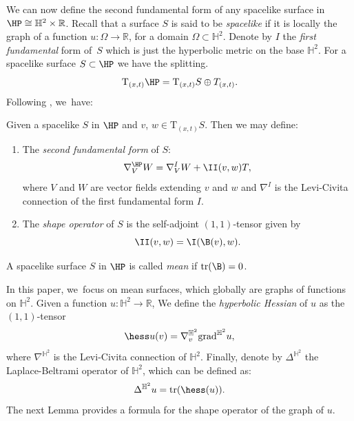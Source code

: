 We can now define the second fundamental form of any spacelike surface in $\HP\cong\mathbb{H}^2\times\mathbb{R}$. Recall that a surface $S$ is said to be \emph{spacelike} if it is locally the graph of a function $u : \Omega \to\mathbb{R}$, for a domain $\Omega\subset \mathbb{H}^2$. Denote by $I$ the \emph{first fundamental} form of~$S$ which is just the hyperbolic metric on the base $\mathbb{H}^2$. For a spacelike surface $S\subset\HP$ we have the splitting.
\begin{equation}\label{splittingconnection}
\mathrm{T}_{(x,t)}\HP=\mathrm{T}_{(x,t)}S\oplus T_{(x,t)}.
\end{equation}
Following \cite{fillastreseppi}, we~have:
\begin{prop}
Given a spacelike $S$ in $\HP$ and $v$, $w\in\mathrm{T}_{(x,t)}S$. Then we may define:
\begin{enumerate}
\item The \emph{second fundamental form} of $S$:
\[
\nabla_V^{\HP}W=\nabla_V^{I}W+\II(v,w) T,
\]
where $V$ and $W$ are vector fields extending $v$ and $w$ and $\nabla^{I}$ is the Levi-Civita connection of the first fundamental form $I$.
\item The \emph{shape operator} of $S$ is the self-adjoint $(1, 1)$-tensor given by
\[
\II(v,w)=\I(\B(v),w).
\]
\end{enumerate}
\end{prop}
\begin{defi}\label{def_mean_surface}
A spacelike surface $S$ in $\HP$ is called \emph{mean} if $\mathrm{tr}(\B) = 0$.
\end{defi}
In this paper, we~focus on mean surfaces, which globally are graphs of functions on $\mathbb{H}^2$. Given a function $u:\mathbb{H}^2\to \mathbb{R}$, We define the \emph{hyperbolic Hessian} of $u$ as the $(1, 1)$-tensor
\[
\hess u(v)=\nabla^{\mathbb{H}^2}_v\mathrm{grad}^{\mathbb{H}^2} u,
\]
where $\nabla^{\mathbb{H}^2}$ is the Levi-Civita connection of $\mathbb{H}^2$. Finally, denote by $\Delta^{\mathbb{H}^2}$ the Laplace-Beltrami operator of $\mathbb{H}^2$, which can be defined as:
\[
\Delta^{\mathbb{H}^2}u=\mathrm{tr}(\hess(u)).
\]
The next Lemma provides a formula for the shape operator of the graph of $u$.

